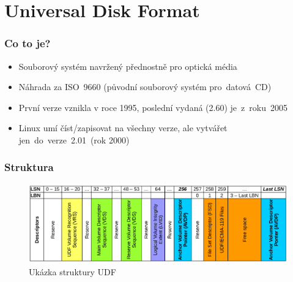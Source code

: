 \documentclass[aspectratio=169]{beamer}
\begin{document}
	\section{Universal Disk Format}
		\begin{frame}
			\frametitle{Co to je?}
            \begin{itemize}
                \Large\item Souborový systém navržený přednostně pro optická média
                \Large\item Náhrada za ISO~9660 (původní souborový systém pro~datová~CD)
                \Large\item První verze vznikla v roce 1995, poslední vydaná (2.60) je~z~roku~2005
                \Large\item Linux umí číst/zapisovat na všechny verze, ale vytvářet jen~do~verze~2.01~(rok 2000)
            \end{itemize}
        \end{frame}
		\begin{frame}
			\frametitle{Struktura}
			\vspace{40 pt}
			\center
            \begin{figure}
			    \includegraphics[width=14cm]{UDF-example-schema.png}
                \caption{\Large{Ukázka struktury UDF}}
            \end{figure}
		\end{frame}
	
\end{document}
